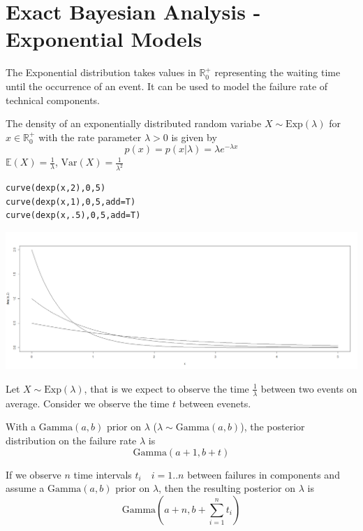 \documentclass[11pt]{article}
\begin{document}
\section{Exact Bayesian Analysis - Exponential Models}
The Exponential distribution takes values in $\mathbb{R}_0^+$ representing the waiting time until the occurrence of an event. It can be used to model the failure rate of technical components.

The density of an exponentially distributed random variabe $X \sim \text{Exp}(\lambda)$ for $x\in\mathbb{R}_0^+$ with the rate parameter $\lambda>0$ is given by
\begin{equation*}
	p(x) = p(x|\lambda) = \lambda e^{-\lambda x}
\end{equation*}
\noindent
$\mathbb{E}(X) = \frac{1}{\lambda}$, $\text{Var}(X) = \frac{1}{\lambda^2}$

\begin{verbatim}
curve(dexp(x,2),0,5)
curve(dexp(x,1),0,5,add=T)
curve(dexp(x,.5),0,5,add=T)
\end{verbatim}

\begin{center}
	\includegraphics[width=0.8\linewidth]{img/exponential_distribution_curves}
\end{center}

Let $X \sim \text{Exp}(\lambda)$, that is we expect to observe the time $\frac{1}{\lambda}$ between two events on average. Consider we observe the time $t$ between evenets.

With a $\text{Gamma}(a,b)$ prior on $\lambda$ ($\lambda \sim \text{Gamma}(a,b)$), the posterior distribution on the failure rate $\lambda$ is
\begin{equation*}
	\text{Gamma}(a+1,b+t)
\end{equation*}

If we observe $n$ time intervals $t_i\quad i=1..n$ between failures in components and assume a $\text{Gamma}(a,b)$ prior on $\lambda$, then the resulting posterior on $\lambda$ is
\begin{equation*}
	\text{Gamma}(a+n,b+\sum_{i=1}^{n} t_i)
\end{equation*}
\end{document}
